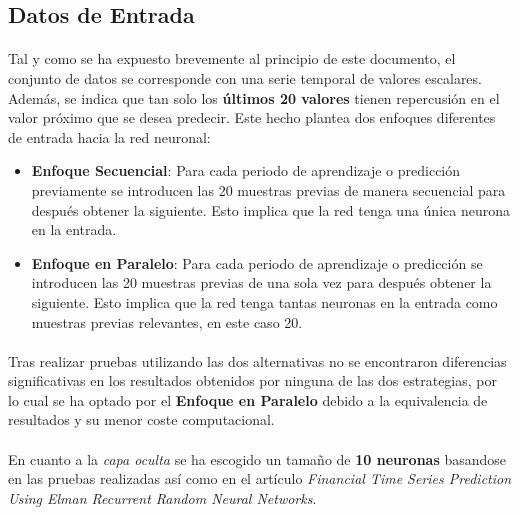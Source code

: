 \documentclass[10pt, a4paper,spanish]{article}
\begin{document}
		\subsection{Datos de Entrada}

			\paragraph{}
			Tal y como se ha expuesto brevemente al principio de este documento, el conjunto de datos se corresponde con una serie temporal de valores escalares. Además, se indica que tan solo los \textbf{últimos 20 valores} tienen repercusión en el valor próximo que se desea predecir. Este hecho plantea dos enfoques diferentes de entrada hacia la red neuronal:

 			\begin{itemize}
 				\item \textbf{Enfoque Secuencial}: Para cada periodo de aprendizaje o predicción previamente se introducen las 20 muestras previas de manera secuencial para después obtener la siguiente. Esto implica que la red tenga una única neurona en la entrada.

				\item \textbf{Enfoque en Paralelo}: Para cada periodo de aprendizaje o predicción se introducen las 20 muestras previas de una sola vez para después obtener la siguiente. Esto implica que la red tenga tantas neuronas en la entrada como muestras previas relevantes, en este caso 20.
 			\end{itemize}

			\paragraph{}
			Tras realizar pruebas utilizando las dos alternativas no se encontraron diferencias significativas en los resultados obtenidos por ninguna de las dos estrategias, por lo cual se ha optado por el \textbf{Enfoque en Paralelo} debido a la equivalencia de resultados y su menor coste computacional.

			\paragraph{}
			En cuanto a la \emph{capa oculta} se ha escogido un tamaño de \textbf{10 neuronas} basandose en las pruebas realizadas así como en el artículo \emph{Financial Time Series Prediction Using Elman Recurrent Random Neural Networks}\cite{financial:article}.
\end{document}
